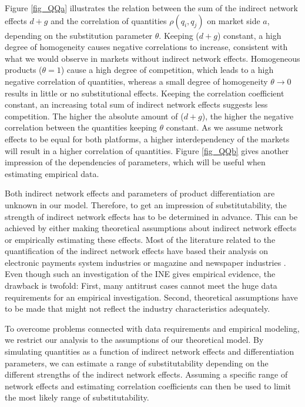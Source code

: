 \documentclass[12pt,a4paper,notitlepage]{article}
\begin{document}
Figure \ref{fig_QQa} illustrates the relation between the sum of the indirect network effects $d+g$ and the correlation of quantities $\rho(q_i,q_j)$ on market side $a$, depending on the substitution parameter $\theta$. Keeping ($d+g$) constant, a high degree of homogeneity causes negative correlations to increase, consistent with what we would observe in markets without indirect network effects. Homogeneous products ($\theta=1$) cause a high degree of competition, which leads to a high negative correlation of quantities, whereas a small degree of homogeneity $\theta \to 0$ results in little or no substitutional effects. Keeping the correlation coefficient constant, an increasing total sum of indirect network effects suggests less competition. The higher the absolute amount of ($d+g$), the higher the negative correlation between the quantities keeping $\theta$ constant. As we assume network effects to be equal for both platforms, a higher interdependency of the markets will result in a higher correlation of quantities. Figure \ref{fig_QQb} gives another impression of the dependencies of parameters, which will be useful when estimating empirical data.

Both indirect network effects and parameters of product differentiation are unknown in our model. Therefore, to get an impression of substitutability, the strength of indirect network effects has to be determined in advance. This can be achieved by either making theoretical assumptions about indirect network effects or empirically estimating these effects. Most of the literature related to the quantification of the indirect network effects have based their analysis on electronic payments system industries \citep{ackerberg_quantifying_2006, rysman_empirical_2007} or magazine and newspaper industries \citep{kaiser_price_2006, argentesi_estimating_2007}. Even though such an investigation of the INE gives empirical evidence, the drawback is twofold: First, many antitrust cases cannot meet the huge data requirements for an empirical investigation. Second, theoretical assumptions have to be made that might not reflect the industry characteristics adequately. 

To overcome problems connected with data requirements and empirical modeling, we restrict our analysis to the assumptions of our theoretical model. By simulating quantities as a function of indirect network effects and differentiation parameters, we can estimate a range of substitutability depending on the different strengths of the indirect network effects. Assuming a specific range of network effects and estimating correlation coefficients can then be used to limit the most likely range of substitutability.  
\end{document}
